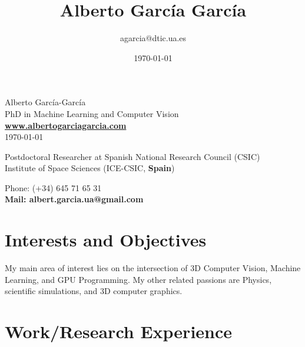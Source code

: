 \documentclass[8pt]{article}
\title{\bfseries\Huge Alberto García García}
\author{agarcia@dtic.ua.es}
\date{\today}
\begin{document}
\begin{center}
	\Huge Alberto García-García\\
	\Large PhD in Machine Learning and Computer Vision\\
	\Large \textbf{\url{www.albertogarciagarcia.com}}\\
	\today
\end{center}
\bigskip
\begin{minipage}[ht]{0.65\textwidth}
Postdoctoral Researcher at Spanish National Research Council (CSIC)\\
Institute of Space Sciences (ICE-CSIC, \textbf{Spain})\\
\end{minipage}
\hfill
\begin{minipage}[ht]{0.35\textwidth}
Phone: (+34) 645 71 65 31\\
\textbf{Mail: albert.garcia.ua@gmail.com}\\
\end{minipage}
 
\section*{Interests and Objectives}

My main area of interest lies on the intersection of 3D Computer Vision, Machine Learning, and GPU Programming. My other related passions are Physics, scientific simulations, and 3D computer graphics.
 
\section*{Work/Research Experience}
\end{document}
